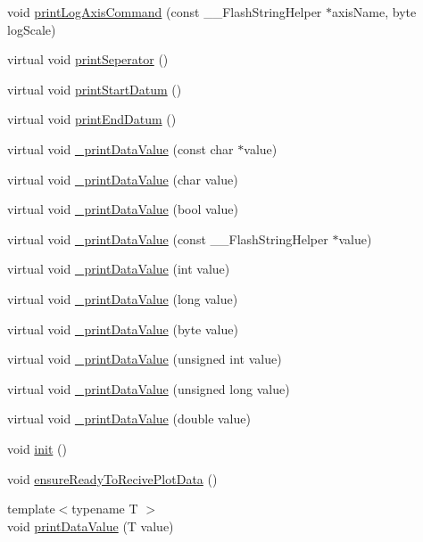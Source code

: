 \begin{DoxyCompactItemize}
void \hyperlink{class_g_n_u_plot_base_ad7e8ef8d8e5eb80119fc0cce9be2d525}{print\+Log\+Axis\+Command} (const \+\_\+\+\_\+\+Flash\+String\+Helper $\ast$axis\+Name, byte log\+Scale)
\item 
virtual void \hyperlink{class_g_n_u_plot_base_ae204818b4e8dcd9d2f6b5426127ca2cf}{print\+Seperator} ()
\item 
virtual void \hyperlink{class_g_n_u_plot_base_ac2b48b822b6043392b514c9580b1661a}{print\+Start\+Datum} ()
\item 
virtual void \hyperlink{class_g_n_u_plot_base_aff02bc279e6c3cb83f2cdc7aa021268f}{print\+End\+Datum} ()
\item 
virtual void \hyperlink{class_g_n_u_plot_base_ad00a12fd681e4638fae005891fd72f38}{\+\_\+print\+Data\+Value} (const char $\ast$value)
\item 
virtual void \hyperlink{class_g_n_u_plot_base_aa6c6dfff0568dd99c0c28081c41b4433}{\+\_\+print\+Data\+Value} (char value)
\item 
virtual void \hyperlink{class_g_n_u_plot_base_a6f14fc040ff833c685ab09fc7917e059}{\+\_\+print\+Data\+Value} (bool value)
\item 
virtual void \hyperlink{class_serial_graph_a0c4d2c1239de3107d7332389183b05a1}{\+\_\+print\+Data\+Value} (const \+\_\+\+\_\+\+Flash\+String\+Helper $\ast$value)
\item 
virtual void \hyperlink{class_serial_graph_a58edf4683c600b6bfa1714b0f8dfc82c}{\+\_\+print\+Data\+Value} (int value)
\item 
virtual void \hyperlink{class_serial_graph_a9a4903d4fa26bb85ba5dd93c4365bcc2}{\+\_\+print\+Data\+Value} (long value)
\item 
virtual void \hyperlink{class_serial_graph_acada5333b96b65e31d8c76c3ab22905f}{\+\_\+print\+Data\+Value} (byte value)
\item 
virtual void \hyperlink{class_serial_graph_acd91cf0c3a0f49d4bdf18b447503da23}{\+\_\+print\+Data\+Value} (unsigned int value)
\item 
virtual void \hyperlink{class_serial_graph_a6dbfe61ee398e18c1b752a3748df9663}{\+\_\+print\+Data\+Value} (unsigned long value)
\item 
virtual void \hyperlink{class_serial_graph_a766d5838ede9c8fa998ce8664e5f92be}{\+\_\+print\+Data\+Value} (double value)
\item 
void \hyperlink{class_serial_graph_a760dd00474c9780c81ece7cdf621fc15}{init} ()
\item 
void \hyperlink{class_serial_graph_abd43150abedec26eef3994cd33035173}{ensure\+Ready\+To\+Recive\+Plot\+Data} ()
\item 
{\footnotesize template$<$typename T $>$ }\\void \hyperlink{class_serial_graph_a91e20c05c8cc612fd9ffd85880149264}{print\+Data\+Value} (T value)
\end{DoxyCompactItemize}
